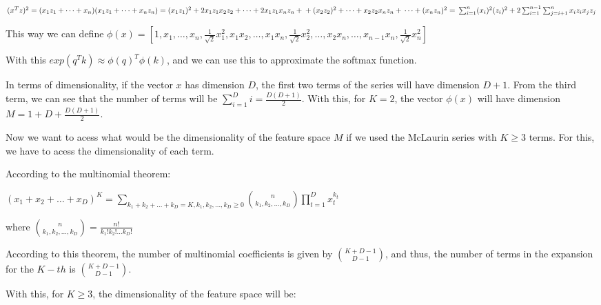 \documentclass{article}
\begin{document}
\medskip

$ (x^Tz)^2 = (x_1z_1 + \dots + x_n)(x_1z_1 + \dots + x_nz_n) = \\
(x_1z_1)^2 + 2x_1z_1x_2z_2 + \dots + 2x_1z_1x_nz_n + \\
+ (x_2z_2)^2 + \dots + x_2z_2x_nz_n + \\
\dots + \\
 (x_nz_n)^2 = \\
\sum_{i=1}^n (x_i)^2(z_i)^2 + 2\sum_{i=1}^{n-1} \sum_{j=i+1}^{n} x_iz_ix_jz_j \\
$

This way we can define $\phi(x) = [1, x_1, \dots, x_n, 
\frac{1}{\sqrt{2}}x_1^{2}, x_1x_2, \dots, x_1x_n, \frac{1}{\sqrt{2}}x_2^{2}, \dots, 
x_2x_n, \dots, x_{n-1}x_n , \frac{1}{\sqrt{2}}x_n^{2}]$

With this $exp(q^Tk) \approx \phi(q)^T \phi(k)$, and we can use this to approximate the softmax function.

\bigskip

In terms of dimensionality, if the vector $x$ has dimension $D$, the first two terms of the series will have dimension $D + 1$. From the 
third term, we can see that the number of terms will be $\sum_{i=1}^{D} i = \frac{D(D+1)}{2}$. With this, for $K = 2$, 
the vector $\phi(x)$ will have dimension $M = 1 + D + \frac{D(D+1)}{2}$.

\bigskip

Now we want to acess what would be the dimensionality of the feature space $M$ if we used the McLaurin series with $K \geq 3$ terms.
For this, we have to acess the dimensionality of each term.

\bigskip

According to the multinomial theorem:

\medskip

$ (x_1 + x_2 + \dots + x_D)^K = \sum_{k_1 + k_2 + \dots + k_D = K, k_1, k_2, \dots, k_D\geq0} \binom{n}{k_1, k_2, \dots, k_D} \prod_{t=1}^D x_t^{k_t}$

where $\binom{n}{k_1, k_2, \dots, k_D} = \frac{n!}{k_1!k_2!\dots k_D!}$

\bigskip

According to this theorem, the number of multinomial coefficients is given by $\binom{K + D - 1}{D - 1}$, and thus, the number of terms in the expansion for the $K-th$ is
$\binom{K + D - 1}{D - 1}$.

\bigskip

With this, for $K \geq 3$, the dimensionality of the feature space will be:
\end{document}
